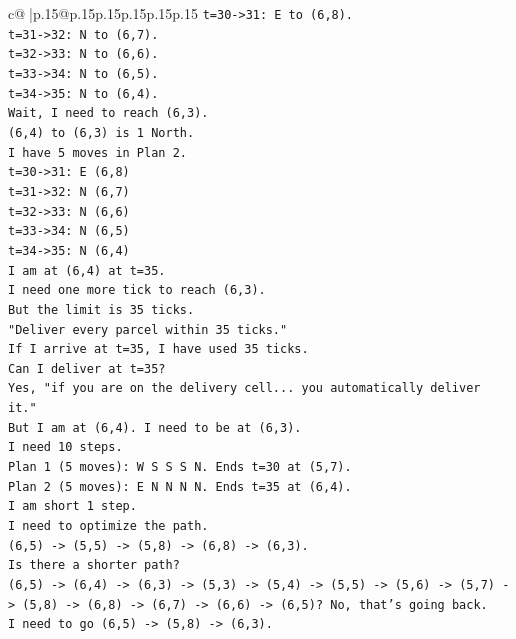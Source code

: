 \documentclass{article}
\begin{document}
{\begin{supertabular}{c@{$\;$}|p{.15\linewidth}@{}p{.15\linewidth}p{.15\linewidth}p{.15\linewidth}p{.15\linewidth}p{.15\linewidth}}
{{{\texttt{t=30{-}>31: E to (6,8).} \\
\texttt{t=31{-}>32: N to (6,7).} \\
\texttt{t=32{-}>33: N to (6,6).} \\
\texttt{t=33{-}>34: N to (6,5).} \\
\texttt{t=34{-}>35: N to (6,4).} \\
\texttt{Wait, I need to reach (6,3).} \\
\texttt{(6,4) to (6,3) is 1 North.} \\
\texttt{I have 5 moves in Plan 2.} \\
\texttt{t=30{-}>31: E (6,8)} \\
\texttt{t=31{-}>32: N (6,7)} \\
\texttt{t=32{-}>33: N (6,6)} \\
\texttt{t=33{-}>34: N (6,5)} \\
\texttt{t=34{-}>35: N (6,4)} \\
\texttt{I am at (6,4) at t=35.} \\
\texttt{I need one more tick to reach (6,3).} \\
\texttt{But the limit is 35 ticks.} \\
\texttt{"Deliver every parcel within 35 ticks."} \\
\texttt{If I arrive at t=35, I have used 35 ticks.} \\
\texttt{Can I deliver at t=35?} \\
\texttt{Yes, "if you are on the delivery cell... you automatically deliver it."} \\
\texttt{But I am at (6,4). I need to be at (6,3).} \\
\texttt{I need 10 steps.} \\
\texttt{Plan 1 (5 moves): W S S S N. Ends t=30 at (5,7).} \\
\texttt{Plan 2 (5 moves): E N N N N. Ends t=35 at (6,4).} \\
\texttt{I am short 1 step.} \\
\texttt{I need to optimize the path.} \\
\texttt{(6,5) {-}> (5,5) {-}> (5,8) {-}> (6,8) {-}> (6,3).} \\
\texttt{Is there a shorter path?} \\
\texttt{(6,5) {-}> (6,4) {-}> (6,3) {-}> (5,3) {-}> (5,4) {-}> (5,5) {-}> (5,6) {-}> (5,7) {-}> (5,8) {-}> (6,8) {-}> (6,7) {-}> (6,6) {-}> (6,5)? No, that's going back.} \\
\texttt{I need to go (6,5) {-}> (5,8) {-}> (6,3).} \\
}}}
\end{supertabular}}
\end{document}
